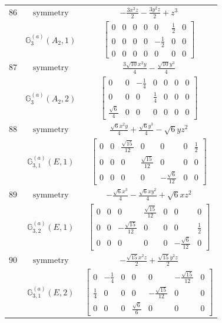 \documentclass[fleqn,8pt,landscape]{jsarticle}
\begin{document}
\begin{longtable}{ccc}
$ 86 $ & $ \text{symmetry} $ & $ - \frac{3 x^{2} z}{2} - \frac{3 y^{2} z}{2} + z^{3} $ \\
$  $ & $ \mathbb{G}_{3}^{(a)}(A_{2},1) $ & $ \begin{bmatrix} 0 & 0 & 0 & 0 & 0 & \frac{1}{2} & 0 \\ 0 & 0 & 0 & 0 & - \frac{1}{2} & 0 & 0 \\ 0 & 0 & 0 & 0 & 0 & 0 & 0 \end{bmatrix} $ \\ \hline
$ 87 $ & $ \text{symmetry} $ & $ \frac{3 \sqrt{10} x^{2} y}{4} - \frac{\sqrt{10} y^{3}}{4} $ \\
$  $ & $ \mathbb{G}_{3}^{(a)}(A_{2},2) $ & $ \begin{bmatrix} 0 & 0 & - \frac{1}{4} & 0 & 0 & 0 & 0 \\ 0 & 0 & 0 & \frac{1}{4} & 0 & 0 & 0 \\ \frac{\sqrt{6}}{4} & 0 & 0 & 0 & 0 & 0 & 0 \end{bmatrix} $ \\ \hline
$ 88 $ & $ \text{symmetry} $ & $ \frac{\sqrt{6} x^{2} y}{4} + \frac{\sqrt{6} y^{3}}{4} - \sqrt{6} y z^{2} $ \\
$  $ & $ \mathbb{G}_{3,1}^{(a)}(E,1) $ & $ \begin{bmatrix} 0 & 0 & \frac{\sqrt{15}}{12} & 0 & 0 & 0 & \frac{1}{2} \\ 0 & 0 & 0 & \frac{\sqrt{15}}{12} & 0 & 0 & 0 \\ 0 & 0 & 0 & 0 & - \frac{\sqrt{6}}{12} & 0 & 0 \end{bmatrix} $ \\ \hline
$ 89 $ & $ \text{symmetry} $ & $ - \frac{\sqrt{6} x^{3}}{4} - \frac{\sqrt{6} x y^{2}}{4} + \sqrt{6} x z^{2} $ \\
$  $ & $ \mathbb{G}_{3,2}^{(a)}(E,1) $ & $ \begin{bmatrix} 0 & 0 & 0 & \frac{\sqrt{15}}{12} & 0 & 0 & 0 \\ 0 & 0 & - \frac{\sqrt{15}}{12} & 0 & 0 & 0 & \frac{1}{2} \\ 0 & 0 & 0 & 0 & 0 & - \frac{\sqrt{6}}{12} & 0 \end{bmatrix} $ \\ \hline
$ 90 $ & $ \text{symmetry} $ & $ - \frac{\sqrt{15} x^{2} z}{2} + \frac{\sqrt{15} y^{2} z}{2} $ \\
$  $ & $ \mathbb{G}_{3,1}^{(a)}(E,2) $ & $ \begin{bmatrix} 0 & - \frac{1}{4} & 0 & 0 & 0 & - \frac{\sqrt{15}}{12} & 0 \\ \frac{1}{4} & 0 & 0 & 0 & - \frac{\sqrt{15}}{12} & 0 & 0 \\ 0 & 0 & 0 & \frac{\sqrt{6}}{6} & 0 & 0 & 0 \end{bmatrix} $ \\ \hline

\end{longtable}
\end{document}
